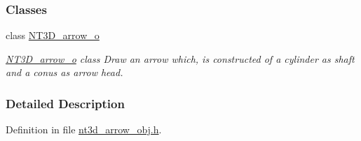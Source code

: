 \subsubsection*{Classes}
\begin{DoxyCompactItemize}
\item 
class \hyperlink{class_n_t3_d__arrow__o}{NT3D\_\-arrow\_\-o}
\begin{DoxyCompactList}\small\item\em \hyperlink{class_n_t3_d__arrow__o}{NT3D\_\-arrow\_\-o} class Draw an arrow which, is constructed of a cylinder as shaft and a conus as arrow head. \item\end{DoxyCompactList}\end{DoxyCompactItemize}


\subsubsection{Detailed Description}


Definition in file \hyperlink{nt3d__arrow__obj_8h_source}{nt3d\_\-arrow\_\-obj.h}.

